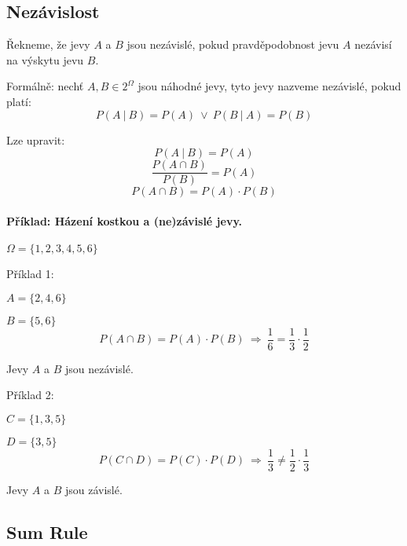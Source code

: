 \subsection{Nezávislost}

\begin{compactitem}
    \item Řekneme, že jevy $A$ a $B$ jsou nezávislé, pokud pravděpodobnost jevu $A$ nezávisí na výskytu jevu $B$.

    \item Formálně: nechť $A, B \in 2^{\Omega}$ jsou náhodné jevy, tyto jevy nazveme nezávislé, pokud platí:
    $$ P(A ~|~ B) = P(A) ~\lor~ P(B ~|~ A) = P(B)$$

    \item Lze upravit:
    $$ P(A ~|~ B) = P(A) $$
    $$ \frac{P(A \cap B)}{P(B)} = P(A) $$
    $$ P(A \cap B) = P(A) \cdot P(B) $$

\end{compactitem}

\paragraph*{Příklad: Házení kostkou a (ne)závislé jevy.}

\begin{compactitem}
    \item $\Omega = \{ 1,2,3,4,5,6 \}$
    \item Příklad 1: \begin{compactitem}
        \item $A = \{ 2,4,6 \}$
        \item $B = \{ 5,6 \}$
        $$ P(A \cap B) = P(A) \cdot P(B) ~\Rightarrow~ \frac{1}{6} = \frac{1}{3} \cdot \frac{1}{2} $$
        \item Jevy $A$ a $B$ jsou nezávislé.
    \end{compactitem}

    \item Příklad 2: \begin{compactitem}
        \item $C = \{ 1,3,5 \}$
        \item $D = \{ 3,5 \}$
        $$ P(C \cap D) = P(C) \cdot P(D) ~\Rightarrow~ \frac{1}{3} \not= \frac{1}{2} \cdot \frac{1}{3} $$
        \item Jevy $A$ a $B$ jsou závislé.
    \end{compactitem}
\end{compactitem}

\subsection{Sum Rule}

